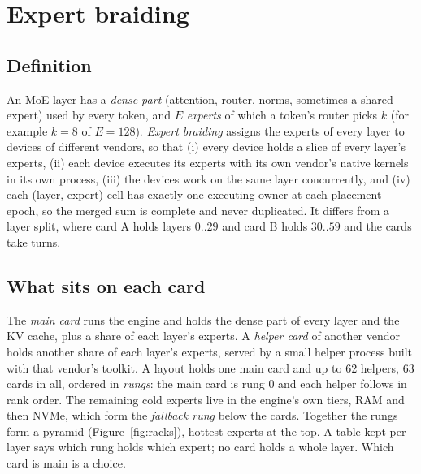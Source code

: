 \documentclass[11pt]{article}
\begin{document}
\section{Expert braiding}
\subsection{Definition}
An MoE layer has a \emph{dense part} (attention, router, norms, sometimes a shared expert) used by every token, and $E$
\emph{experts} of which a token's router picks $k$ (for example $k=8$ of $E=128$). \emph{Expert braiding} assigns the
experts of every layer to devices of different vendors, so that (i) every device holds a slice of every layer's
experts, (ii) each device executes its experts with its own vendor's native kernels in its own process, (iii) the
devices work on the same layer concurrently, and (iv) each (layer, expert) cell has exactly one executing owner at each
placement epoch, so the merged sum is complete and never duplicated. It differs from a layer split, where card A holds
layers $0..29$ and card B holds $30..59$ and the cards take turns.

\subsection{What sits on each card}
The \emph{main card} runs the engine and holds the dense part of every layer and the KV cache, plus a share of each
layer's experts. A \emph{helper card} of another vendor holds another share of each layer's experts, served by a
small helper process built with that vendor's toolkit. A layout holds one main card and up to 62
helpers, 63 cards in all, ordered in \emph{rungs}: the main card is rung 0 and each helper follows in rank order. The
remaining cold experts live in the engine's own tiers, RAM and then NVMe, which form the \emph{fallback rung} below the
cards. Together the rungs form a pyramid (Figure~\ref{fig:racks}), hottest experts at the top. A table kept per layer says
which rung holds which expert; no card holds a whole layer. Which card is main is a choice.
\end{document}
